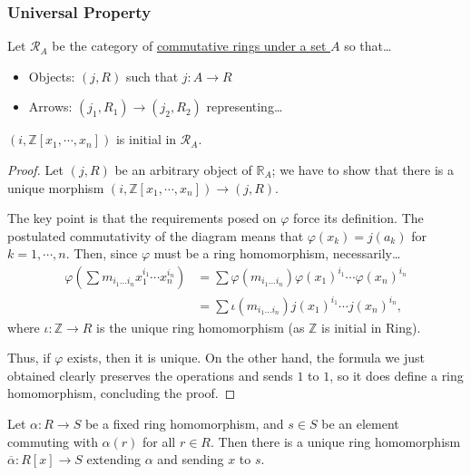 \subsubsection{Universal Property}\label{universalpropertyofpolynomialrings}
Let $\mathcal{R}_A$ be the category of \hyperref[objectsunder]{commutative rings under a set $A$} so that\dots
\begin{itemize}
  \item Objects: $(j, R)$ such that $j : A \rightarrow R$ 
  \item Arrows: $(j_1, R_1) \rightarrow (j_2, R_2)$ representing\dots
  \begin{figure}[H]
	  \centering
	  
  \end{figure}
\end{itemize}

\begin{proposition}
$(i, \mathbb{Z}[x_1,\cdots,x_n])$ is initial in $\mathcal{R}_A$.
\end{proposition}

\begin{proof}
Let $(j,R)$ be an arbitrary object of $\mathbb{R}_A$; we have to show that there is a unique morphism $(i, \mathbb{Z}[x_1, \cdots, x_n]) \rightarrow (j, R)$.

The key point is that the requirements posed on $\varphi$ force its definition. The postulated commutativity of the diagram means that $\varphi(x_k) = j(a_k)$
for $k = 1, \cdots, n$. Then, since $\varphi$ must be a ring homomorphism, necessarily\dots
\begin{align*}
\varphi(\sum m_{i_1\dots i_n}x_1^{i_1}\cdots x_n^{i_n}) &= \sum \varphi(m_{i_1\dots i_n})\varphi(x_1)^{i_1}\cdots \varphi(x_n)^{i_n} \\
														&= \sum \iota(m_{i_1\dots i_n})j(x_1)^{i_1}\cdots j(x_n)^{i_n},
\end{align*}
where $\iota: \mathbb{Z} \rightarrow R$ is the unique ring homomorphism (as $\mathbb{Z}$ is initial in Ring).

Thus, if $\varphi$ exists, then it is unique. On the other hand, the formula we just obtained clearly preserves the operations and sends $1$ to $1$,
so it does define a ring homomorphism, concluding the proof.
\end{proof}

\label{polynomialevaluationmap}
Let $\alpha: R \rightarrow S$ be a fixed ring homomorphism, and $s \in S$ be an element commuting with $\alpha(r)$ for all $r \in R$.
Then there is a unique ring homomorphism $\overline{\alpha}: R[x] \rightarrow S$ extending $\alpha$ and sending $x$ to $s$.\newline

